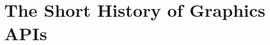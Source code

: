 \section{The Short History of Graphics APIs}\label{sec:short_history}
\begin{sectionmeta}
\end{sectionmeta}